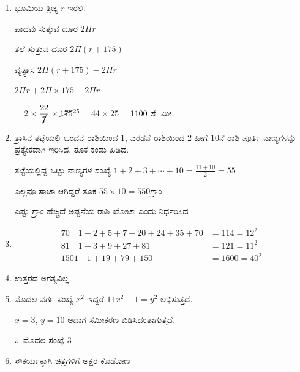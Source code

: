 \begin{enumerate}
\item ಭೂಮಿಯ ತ್ರಿಜ್ಯ $r$ ಇರಲಿ. 

\vskip 0.1cm
ಪಾದವು ಸುತ್ತುವ ದೂರ $2\Pi r$

\vskip 0.1cm
ತಲೆ ಸುತ್ತುವ ದೂರ $2\Pi (r + 175)$

\vskip 0.1cm
ವ್ಯತ್ಯಾಸ $2\Pi (r + 175) - 2\Pi r$

\vskip 0.1cm
$2\Pi r + 2\Pi\times 175 - 2\Pi r$

\smallskip
$= 2\times \dfrac{22}{\cancel{7}} \times \cancel{175}^{25} = 44\times 25 = 1100$ ಸೆ. ಮೀ 

\item ತ್ರಾಸಿನ ತಟ್ಟೆಯಲ್ಲಿ ಒಂದನೆ ರಾಶಿಯಿಂದ 1, ಎರಡನೆ ರಾಶಿಯಿಂದ 2 ಹೀಗೆ 10ನೆ ರಾಶಿ ಪೂರ್ತಿ ನಾಣ್ಯಗಳನ್ನು ಪ್ರತ್ಯೇಕವಾಗಿ ಇರಿಸಿದ. ತೂಕ ಕಂಡು ಹಿಡಿದ. 

\vskip 0.1cm
ತಟ್ಟೆಯಲ್ಲಿದ್ದ ಒಟ್ಟು ನಾಣ್ಯಗಳ ಸಂಖ್ಯೆ $1 +2 + 3 + \cdots + 10 = \frac{11 + 10}{2} = 55$

\vskip 0.1cm
ಎಲ್ಲವೂ ಸಾಚಾ ಆಗಿದ್ದರೆ ತೂಕ $55\times 10 = 550$ಗ್ರಾಂ 

\vskip 0.1cm
ಎಷ್ಟು ಗ್ರಾಂ ಹೆಚ್ಚಿದೆ ಅಷ್ಟನೆಯ ರಾಶಿ ಖೋಟಾ ಎಂದು ನಿರ್ಧರಿಸಿದ 

\item 
\begin{align*}
70\quad 1+2+5+7+20+24+35+70 & = 114 = 12^{2}\\
81\quad 1+3+9+27+81 & = 121 = 11^{2}\\
1501\quad 1 +19+79+150 & = 1600 = 40^{2}
\end{align*}

\item ಉತ್ತರದ ಅಗತ್ಯವಿಲ್ಲ 

\item ಮೊದಲ ವರ್ಗ ಸಂಖ್ಯೆ $x^{2}$ ಇದ್ದರೆ $11x^{2} + 1 = y^{2}$ ಲಭಿಸುತ್ತದೆ. 

$x = 3$, $y = 10$ ಆದಾಗ ಸಮೀಕರಣ ಬಿಡಿಸಿದಂತಾಗುತ್ತದೆ. 

$\therefore$~ಮೊದಲ ಸಂಖ್ಯೆ  3

\item  ಸೌಕರ್ಯಕ್ಕಾಗಿ ಚಿತ್ರಗಳಿಗೆ ಅಕ್ಷರ ಕೊಡೋಣ 


\end{enumerate}
